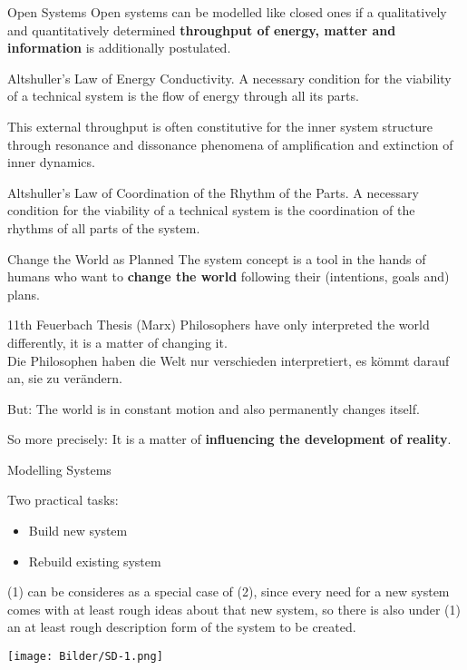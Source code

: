 \documentclass{beamer}
\begin{document}
\begin{frame}{Open Systems}
Open systems can be modelled like closed ones if a qualitatively and
quantitatively determined \textbf{throughput of energy, matter and
  information} is additionally postulated.

\begin{block}{Altshuller's Law of Energy Conductivity.}
  A necessary condition for the viability of a technical system is the flow of
  energy through all its parts.
\end{block}

This external throughput is often constitutive for the inner system structure
through resonance and dissonance phenomena of amplification and extinction of
inner dynamics.

\begin{block}{Altshuller's Law of Coordination of the Rhythm of the Parts.}
  A necessary condition for the viability of a technical system is the
  coordination of the rhythms of all parts of the system.
\end{block}
\end{frame}

\begin{frame}{Change the World as Planned}
The system concept is a tool in the hands of humans who want to \textbf{change
  the world} following their (intentions, goals and) plans.

\begin{block}{11th Feuerbach Thesis (Marx)}
  Philosophers have only interpreted the world differently, it is a matter of
  changing it.\\[4pt] Die Philosophen haben die Welt nur verschieden
  interpretiert, es kömmt darauf an, sie zu verändern.
\end{block}

But: The world is in constant motion and also permanently changes itself.

So more precisely: It is a matter of \textbf{influencing the development of
  reality}.
\end{frame}

\begin{frame}{Modelling Systems}

Two practical tasks:
\begin{itemize}
\item[(1)] Build new system
\item[(2)] Rebuild existing system
\end{itemize}

(1) can be consideres as a special case of (2), since every need for a new
system comes with at least rough ideas about that new system, so there is also
under (1) an at least rough description form of the system to be created.

\begin{center}
  \texttt{[image: Bilder/SD-1.png]}
\end{center}
\end{frame}
\end{document}
